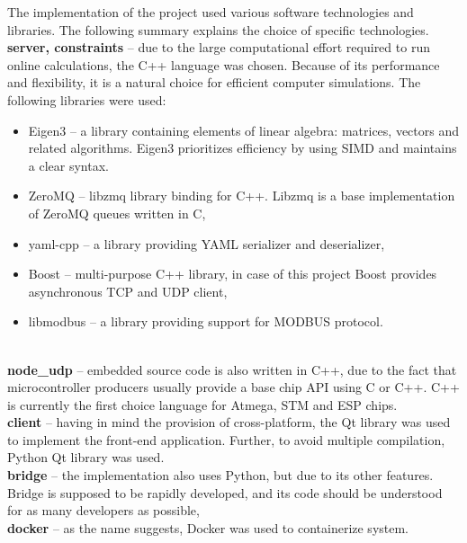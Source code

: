 The implementation of the project used various software technologies and libraries. The following summary explains the choice of specific technologies.\\

\noindent\textbf{server, constraints} -- due to the large computational effort required to run online calculations, the C++ language was chosen. Because of its performance and flexibility, it is a natural choice for efficient computer simulations. The following libraries were used:
\begin{itemize}[noitemsep,nolistsep]
	\item Eigen3 -- a library containing elements of linear algebra: matrices, vectors and related algorithms. Eigen3 prioritizes efficiency by using SIMD and maintains a clear syntax.
	\item ZeroMQ -- libzmq library binding for C++. Libzmq is a base implementation of ZeroMQ queues written in C,
	\item yaml-cpp -- a library providing YAML serializer and deserializer,
	\item Boost -- multi-purpose C++ library, in case of this project Boost provides asynchronous TCP and UDP client,
	\item libmodbus -- a library providing support for MODBUS protocol.
\end{itemize}
\  \\
\textbf{node\_udp} -- embedded source code is also written in C++, due to the fact that microcontroller producers usually provide a base chip API using C or C++. C++ is currently the first choice language for Atmega, STM and ESP chips.\\

\noindent\textbf{client} -- having in mind the provision of cross-platform, the Qt library was used to implement the front-end application. Further, to avoid multiple compilation, Python Qt library was used. \\

\noindent\textbf{bridge} -- the implementation also uses Python, but due to its other features. Bridge is supposed to be rapidly developed, and its code should be understood for as many developers as possible,\\

\noindent\textbf{docker} -- as the name suggests, Docker was used to containerize system.   
	
